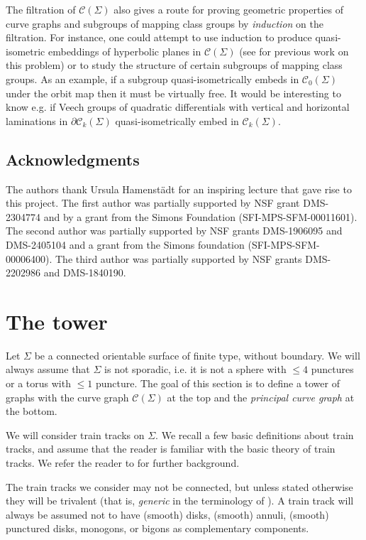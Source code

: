 \documentclass[11pt]{article}
\theoremstyle{remark}
\def\C{{\mathcal C}}
\begin{document}
The filtration of $\C(\Sigma)$ also gives a route for
proving geometric properties of curve graphs and subgroups of mapping class
groups by \emph{induction} on the filtration. For instance, one could attempt to use
induction to produce quasi-isometric embeddings of hyperbolic planes
in $\C(\Sigma)$ (see \cite{LS} for previous work on this problem)
or to study the structure of certain subgroups of mapping class groups.
As an example, if a subgroup quasi-isometrically embeds in $\C_0(\Sigma)$
under the orbit map then it must be virtually free. It would be interesting
to know e.g. if Veech groups of quadratic differentials with vertical and
horizontal laminations in $\partial \C_k(\Sigma)$ quasi-isometrically embed
in $\C_k(\Sigma)$. 

\subsection{Acknowledgments}

The authors thank Ursula Hamenst\"{a}dt for an inspiring lecture that
gave rise to this project. The first author was partially supported by
NSF grant DMS-2304774 and by a grant from the Simons
Foundation (SFI-MPS-SFM-00011601). The second author was partially
supported by NSF grants DMS-1906095 and DMS-2405104 and a grant from the Simons foundation (SFI-MPS-SFM-00006400). The third author was partially
supported by NSF grants DMS-2202986 and DMS-1840190.

\section{The tower}\label{sec:2}

Let $\Sigma$ be a connected orientable surface of finite type, without
boundary.  We will always assume that $\Sigma$ is not sporadic,
i.e. it is not a sphere with $\leq 4$ punctures or a torus with $\leq
1$ puncture. The goal of this section is to define a tower of graphs
with the curve graph $\C(\Sigma)$ at the top and the \emph{principal
curve graph} at the bottom.

We will consider train tracks on $\Sigma$.
We recall a few basic definitions about train tracks, and assume that the reader
is familiar with the basic theory of train tracks. We refer the reader to
\cite{Penner} for further background.

The train tracks we consider may not be connected,
but unless stated otherwise they will be trivalent (that is, {\it generic}
in the terminology of \cite{Penner}).
A train track will always be assumed not to have
(smooth) disks, (smooth) annuli, (smooth) punctured disks,
monogons, or bigons as complementary components.
\end{document}
